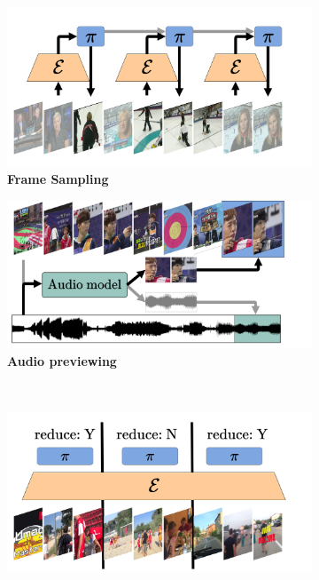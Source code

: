 \begin{figure}[t]
     \centering
     \begin{subfigure}[b]{0.49\linewidth}
         \centering
         \includegraphics[width=\linewidth]{figs/redundancies_reduction/redudancies_sample.pdf}
         \caption{\textbf{Frame Sampling}}
         \label{fig:redundancies_reduction::sampling}
     \end{subfigure}
     \hfill
     \begin{subfigure}[b]{0.49\linewidth}
         \centering
         \includegraphics[width=\linewidth]{figs/redundancies_reduction/redudancies_preview.pdf}
         \caption{\textbf{Audio previewing}}
         \label{fig:redundancies_reduction::preview}
     \end{subfigure}
     \\
     \begin{subfigure}[b]{0.49\linewidth}
         \centering
         \includegraphics[width=\linewidth]{figs/redundancies_reduction/redudancies_permute.pdf}

\end{subfigure}
\end{figure}
